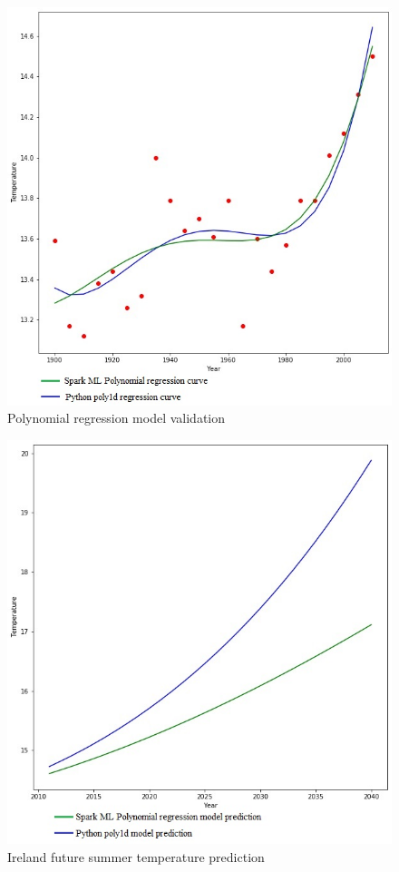 \documentclass[journal,twoside,web]{ieeecolor}
\begin{document}
\begin{figure}[h]
\centering
\captionsetup{justification=centering}
\includegraphics[scale=.50]{Poly_model_validation.jpg}
\caption{Polynomial regression model validation}
\label{PRMV}
\end{figure}

\begin{figure}[h]
\centering
\captionsetup{justification=centering}
\includegraphics[scale=.50]{Ireland_future_summer_temperature_prediction.jpg}
\caption{Ireland future summer temperature prediction}
\label{IRSTP}
\end{figure}
\end{document}
